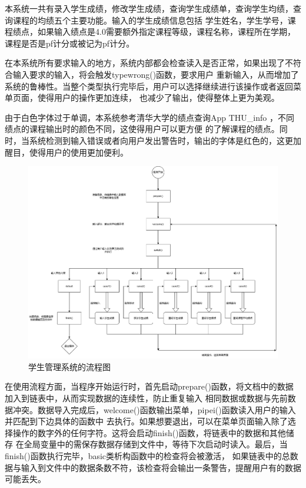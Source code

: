 \documentclass[fontset=windows]{article}
\begin{document}
本系统一共有录入学生成绩，修改学生成绩，查询学生成绩单，查询学生均绩，查询课程的均绩五个主要功能。输入的学生成绩信息包括
学生姓名，学生学号，课程绩点，如果输入绩点是4.0需要额外指定课程等级，课程名称，课程所在学期，课程是否是pf计分或被记为pf计分。

在本系统所有要求输入的地方，系统内部都会检查读入是否正常，如果出现了不符合输入要求的输入，将会触发typewrong()函数，要求用户
重新输入，从而增加了系统的鲁棒性。当整个类型执行完毕后，用户可以选择继续进行该操作或者返回菜单页面，使得用户的操作更加连续，
也减少了输出，使得整体上更为美观。

由于白色字体过于单调，本系统参考清华大学的绩点查询App{ }THU\_info{ }，不同绩点的课程输出时的颜色不同，这使得用户可以更方便
的了解课程的绩点。同时，当系统检测到输入错误或者向用户发出警告时，输出的字体是红色的，这更加醒目，使得用户的使用更加便利。

\begin{figure}[h]
	\hspace{0.1cm}
	\includegraphics[width = 16cm]{picture1.png}
	\vspace{1cm}
	\caption{学生管理系统的流程图}
\end{figure}

在使用流程方面，当程序开始运行时，首先启动prepare()函数，将文档中的数据加入到链表中，从而实现数据的连续性，防止重复输入
相同数据或数据与先前数据冲突。数据导入完成后，welcome()函数输出菜单，pipei()函数读入用户的输入并匹配到下边具体的函数中
去执行。如果想要退出，可以在菜单页面输入除了选择操作的数字外的任何字符。这将会启动finish()函数，将链表中的数据和其他储存
在全局变量中的需保存数据存储到文件中，等待下次启动时读入。最后，当finish()函数执行完毕，basic类析构函数中的检查将会被激活，
如果链表中的总数据与输入到文件中的数据条数不符，该检查将会输出一条警告，提醒用户有的数据可能丢失。
\end{document}

